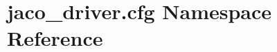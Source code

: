 \hypertarget{namespacejaco__driver_1_1cfg}{}\section{jaco\+\_\+driver.\+cfg Namespace Reference}
\label{namespacejaco__driver_1_1cfg}
